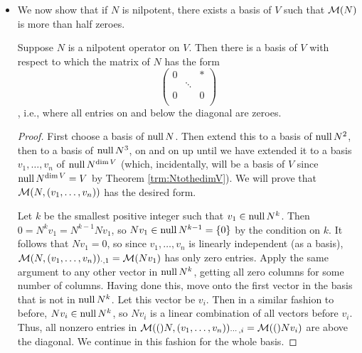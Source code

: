 \documentclass[../main.tex]{subfiles}
\begin{document}
\begin{itemize}
\begin{theorem}
        \begin{proof}
            Since $N$ is nilpotent, we know that there exists a nonnegative integer $j$ such that
            \begin{equation*}
                (N-0I)^jv = N^jv = 0 = 0v
            \end{equation*}
            for any $v\in V$. Thus, $G(0,N)=V$. It follows by Theorem \ref{trm:generalizedEigenspaces} that $V=G(0,N)=\nul(N-0I)^{\dim V}=\nul N^{\dim V}$. Consequently, for any $v\in V$, $N^{\dim V}v=0$, so $N^{\dim V}=0$, as desired.
        \end{proof}
    \end{theorem}
    \item We now show that if $N$ is nilpotent, there exists a basis of $V$ such that $\mathcal{M}(N)$ is more than half zeroes.
    \begin{theorem}\label{trm:nilpotentMatrix}
        Suppose $N$ is a nilpotent operator on $V$. Then there is a basis of $V$ with respect to which the matrix of $N$ has the form
        \begin{equation*}
            \begin{pmatrix}
                0 &  & *\\
                 & \ddots & \\
                0 &  & 0\\
            \end{pmatrix}
        \end{equation*}
        , i.e., where all entries on and below the diagonal are zeroes.
        \begin{proof}
            First choose a basis of $\operatorname{null} N$. Then extend this to a basis of $\operatorname{null} N^2$, then to a basis of $\operatorname{null} N^3$, on and on up until we have extended it to a basis $v_1,\dots,v_n$ of $\operatorname{null} N^{\dim V}$ (which, incidentally, will be a basis of $V$ since $\operatorname{null} N^{\dim V}=V$ by Theorem \ref{trm:NtothedimV}). We will prove that $\mathcal{M}(N,(v_1,\dots,v_n))$ has the desired form.\par
            Let $k$ be the smallest positive integer such that $v_1\in\operatorname{null} N^k$. Then $0=N^kv_1=N^{k-1}Nv_1$, so $Nv_1\in\operatorname{null} N^{k-1}=\{0\}$ by the condition on $k$. It follows that $Nv_1=0$, so since $v_1,\dots,v_n$ is linearly independent (as a basis), $\mathcal{M}(N,(v_1,\dots,v_n))_{\cdot,1}=\mathcal{M}(Nv_1)$ has only zero entries. Apply the same argument to any other vector in $\operatorname{null} N^k$, getting all zero columns for some number of columns. Having done this, move onto the first vector in the basis that is not in $\operatorname{null} N^k$. Let this vector be $v_i$. Then in a similar fashion to before, $Nv_i\in\operatorname{null} N^k$, so $Nv_i$ is a linear combination of all vectors before $v_i$. Thus, all nonzero entries in $\mathcal{M}(()N,(v_1,\dots,v_n))_{\cdots,i}=\mathcal{M}(()Nv_i)$ are above the diagonal. We continue in this fashion for the whole basis.
        \end{proof}
    \end{theorem}
\end{itemize}
\end{document}
